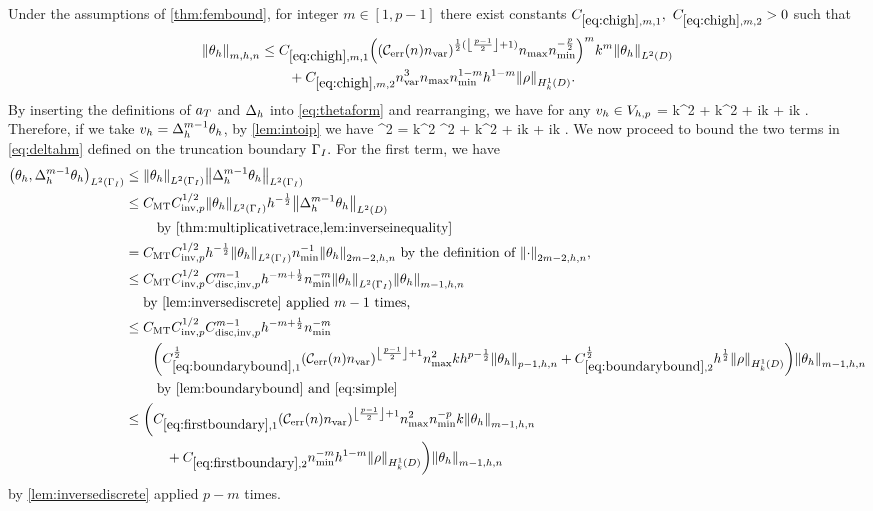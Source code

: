 \label{lem:higherbound}
Under the assumptions of \cref{thm:fembound}, for integer $m \in [1,p-1]$ there exist constants $\Chighmo,$ $\Chighmt > 0$ such that
\begin{align}
\Nfn{m,h,n}{\thetah} &\leq \Chighmo \mleft(\mleft(\En\nvar\mright)^{\half(\floor{\frac{p-1}2}+1)}\nmax\nmin^{-\frac{p}2}\mright)^mk^m \NLtD{\thetah}\nonumber\\
&\quad\quad+ \Chighmt \nvar^3\nmax\nmin^{1-m} h^{1-m} \NHokD{\rho}.\label{eq:chigh}
\end{align}
\ele
{}
By inserting the definitions of $a_{T}$ and $\Delta_{h}$ into \cref{eq:thetaform} and rearranging, we have for any $v_{h} \in V_{h,p}$
\beqs
\IPLtDn{\Deltah \thetah}{\vh} = k^2 \IPLtDn{\thetah}{\vh} + k^2\IPLtDn{\Qhn \rho}{\vh} + ik \IPLtGI{\thetah}{\vh} + ik \IPLtGI{\rho}{\vh}.
\eeqs
Therefore, if we take $v_{h} = \Delta_{h}^{m-1}\theta_{h}$, by \cref{lem:intoip} we have
\beq\label{eq:deltahm}
^2 = k^2 ^2 + k^2  + ik + ik .
\eeq
We now proceed to bound the two terms in \cref{eq:deltahm} defined on the truncation boundary $\Gamma_{I}.$ For the first term, we have
\begin{align}
\IPLtGI{\thetah}{\Deltah^{m-1}\thetah} &\leq \NLtGI{\thetah}\NLtGI{\Deltah^{m-1}\thetah}\nonumber\\
&\leq \CMT \CinvVhp^{1/2} \NLtGI{\thetah} h^{-\half} \NLtD{\Deltah^{m-1} \thetah}\nonumber\\
&\quad\quad\text{ by \cref{thm:multiplicativetrace,lem:inverseinequality}}\nonumber\\
&= \CMT \CinvVhp^{1/2} h^{-\half}\NLtGI{\thetah}\nmin^{-1}\Nfn{2m-2,h,n}{\thetah}\text{ by the definition of }\Nfn{2m-2,h,n}{\cdot},\nonumber\\
&\leq \CMT \CinvVhp^{1/2} \Chinv^{m-1} h^{-m+\half} \nmin^{-m} \NLtGI{\thetah}\Nfn{m-1,h,n}{\thetah}\nonumber\\
&\quad\text{ by \cref{lem:inversediscrete} applied } m-1 \text{ times,}\label{eq:useitagain}\\
&\leq \CMT \CinvVhp^{1/2} \Chinv^{m-1} h^{-m+\half} \nmin^{-m}\nonumber\\
&\quad\quad\mleft(\Cboundaryo^{\half} \mleft(\En\nvar\mright)^{\floor{\frac{p-1}2}+1}\nmax^2 k h^{p-\half} \Nfn{p-1,h,n}{\thetah} + \Cboundaryt^{\half} h^{\half} \NHokD{\rho}\mright)\Nfn{m-1,h,n}{\thetah}\nonumber\\
&\quad\quad\text{ by \cref{lem:boundarybound} and \cref{eq:simple}}\nonumber\\
&\leq \bigg(\CBo \mleft(\En\nvar\mright)^{\floor{\frac{p-1}2}+1}\nmax^2\nmin^{-p}k \Nfn{m-1,h,n}{\thetah}\nonumber\\
&\quad\quad\quad+ \CBt \nmin^{-m}h^{1-m} \NHokD{\rho}\bigg)\Nfn{m-1,h,n}{\thetah}\label{eq:firstboundary}
\end{align}
by \cref{lem:inversediscrete} applied $p-m$ times.

